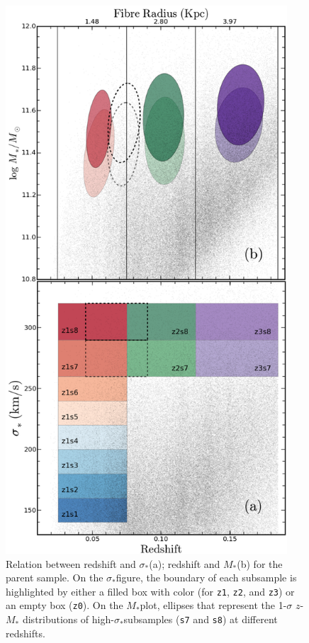 \documentclass[preprint]{aastex}
\def\mstar{$M_{\ast}$}
\def\sigstar{$\sigma_{\ast}$}
\begin{document}
\begin{CJK*}{UTF8}{gbsn}
\clearpage
{}
\begin{figure}
    \centering 
    \includegraphics[width=10.5cm]{figure/fig1.png}
    \caption{
    Relation between redshift and \sigstar (a); redshift and \mstar (b) for 
    the parent sample.  On the \sigstar figure, the boundary of each 
    subsample is highlighted by either a filled box with color (for 
    {\tt z1}, {\tt z2}, and {\tt z3}) or an empty box ({\tt z0}).  On the 
    \mstar plot, ellipses that represent the 1-$\sigma$ $z$-\mstar 
    distributions of high-\sigstar subsamples ({\tt s7} and {\tt s8}) 
    at different redshifts. 
    }
    \label{figure:1}
\end{figure}


\end{CJK*}
\end{document}
